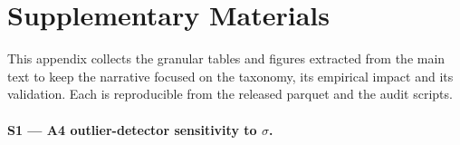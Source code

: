 \documentclass[11pt,a4paper]{article}
\begin{document}
\section*{Supplementary Materials}
This appendix collects the granular tables and figures extracted from the main
text to keep the narrative focused on the taxonomy, its empirical impact
and its validation. Each is reproducible from the released parquet and
the audit scripts.

\setcounter{table}{0}
\setcounter{figure}{0}

\paragraph{S1 --- A4 outlier-detector sensitivity to $\sigma$.}
\end{document}
